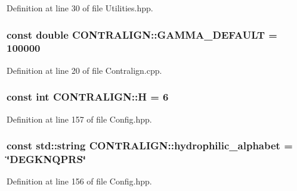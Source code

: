 Definition at line 30 of file Utilities.\+hpp.

\hypertarget{namespace_c_o_n_t_r_a_l_i_g_n_acc27a8d5de00a0e2b28341a554b1671e}{
\subsubsection[{G\+A\+M\+M\+A\+\_\+\+D\+E\+F\+A\+U\+L\+T}]{\setlength{\rightskip}{0pt plus 5cm}const double C\+O\+N\+T\+R\+A\+L\+I\+G\+N\+::\+G\+A\+M\+M\+A\+\_\+\+D\+E\+F\+A\+U\+L\+T = 100000}}\label{namespace_c_o_n_t_r_a_l_i_g_n_acc27a8d5de00a0e2b28341a554b1671e}


Definition at line 20 of file Contralign.\+cpp.

\hypertarget{namespace_c_o_n_t_r_a_l_i_g_n_aaacc59b31308cc741658a6209609157b}{
\subsubsection[{H}]{\setlength{\rightskip}{0pt plus 5cm}const int C\+O\+N\+T\+R\+A\+L\+I\+G\+N\+::\+H = 6}}\label{namespace_c_o_n_t_r_a_l_i_g_n_aaacc59b31308cc741658a6209609157b}


Definition at line 157 of file Config.\+hpp.

\hypertarget{namespace_c_o_n_t_r_a_l_i_g_n_a01d91421b64dd93348343bcaa3b2bedc}{
\subsubsection[{hydrophilic\+\_\+alphabet}]{\setlength{\rightskip}{0pt plus 5cm}const std\+::string C\+O\+N\+T\+R\+A\+L\+I\+G\+N\+::hydrophilic\+\_\+alphabet = \char`\"{}D\+E\+G\+K\+N\+Q\+P\+R\+S\char`\"{}}}\label{namespace_c_o_n_t_r_a_l_i_g_n_a01d91421b64dd93348343bcaa3b2bedc}


Definition at line 156 of file Config.\+hpp.

